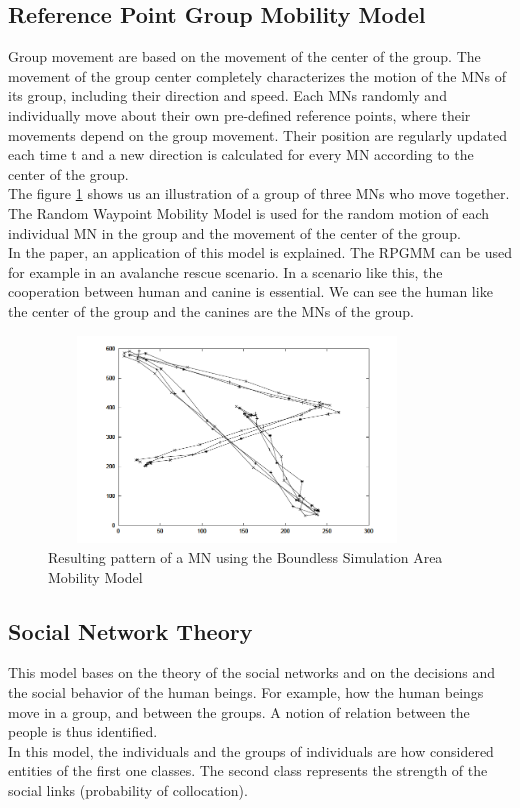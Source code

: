 \newpage
\subsection{Reference Point Group Mobility Model}

Group movement are based on the movement of the center of the group. The movement of the group center completely characterizes the motion of the MNs of its group, including their direction and speed. Each MNs randomly and individually move about their own pre-defined reference points, where their movements depend on the group movement. Their position are regularly updated each time t and a new direction is calculated for every MN according to the center of the group.\\
The figure \ref{RPGMMFig} shows us an illustration of a group of three MNs who move together. The Random Waypoint Mobility Model is used for the random motion of each individual MN in the group and the movement of the center of the group.\\
In the paper, an application of this model is explained. The RPGMM can be used for example in an avalanche rescue scenario. In a scenario like this, the cooperation between human and canine is essential. We can see the human like the center of the group and the canines are the MNs of the group.\\


\begin{figure}[h]
\center
\includegraphics[width=10cm,height=55mm]{../images/rpgmmodel1.png}
\caption{\label{RPGMMFig}Resulting pattern of a MN using the Boundless Simulation Area Mobility Model}
\end{figure}

\newpage
\subsection{Social Network Theory}

This model bases on the theory of the social networks and on the decisions and the social behavior of the human beings. For example, how the human beings move in a group, and between the groups. A notion of relation between the people is thus identified.\\
In this model, the individuals and the groups of individuals are how considered entities of the first one classes. The second class represents the strength of the social links (probability of collocation).\\

